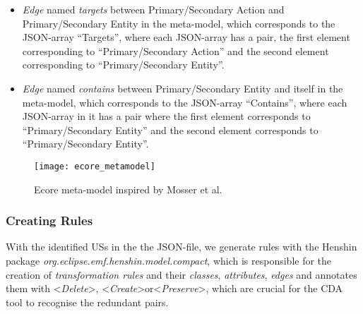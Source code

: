 \begin{itemize}
	\item \textit{Edge} named \textit{targets} between Primary/Secondary Action and Primary/Secondary Entity in the meta-model, which corresponds to the JSON-array \enquote{Targets}, where each JSON-array has a pair, the first element corresponding to \enquote{Primary/Secondary Action} and the second element corresponding to \enquote{Primary/Secondary Entity}.
	\item \textit{Edge} named \textit{contains} between Primary/Secondary Entity and itself in the meta-model, which corresponds to the JSON-array \enquote{Contains}, where each JSON-array in it has a pair where the first element corresponds to \enquote{Primary/Secondary Entity} and the second element corresponds to \enquote{Primary/Secondary Entity}.
\end{itemize}

\begin{figure}[h]
	\centering
	\texttt{[image: ecore\_metamodel]}
	\caption{Ecore meta-model inspired by Mosser et al. \cite{mosser2022modelling}}\label{fig:ecore_meta_model}
\end{figure} 
\subsubsection*{Creating Rules}\label{workflow_rule_creator}
With the identified USs in the the JSON-file, we generate rules with the Henshin package \textit{org.eclipse.emf.henshin.model.compact}, which is responsible for the creation of \textit{transformation rules} and their \textit{classes}, \textit{attributes}, \textit{edges} and annotates them with \textless\emph{Delete}\textgreater, \textless\textit{Create}\textgreater or\textless\textit{Preserve}\textgreater, which are crucial for the CDA tool to recognise the redundant pairs.

